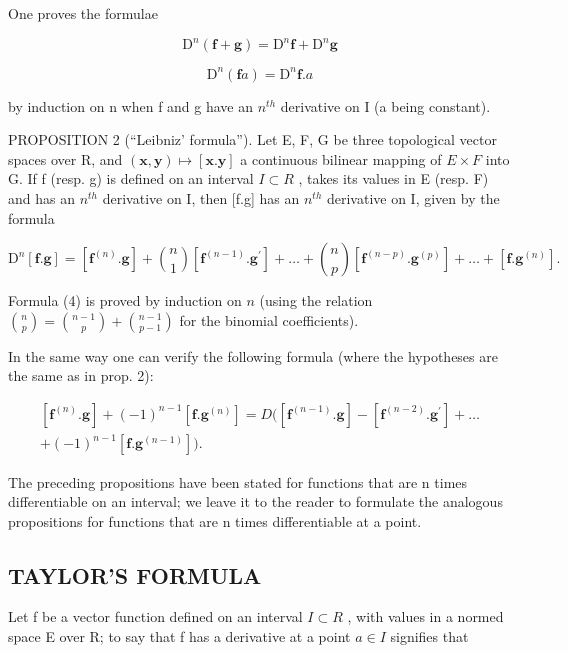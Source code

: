 One proves the formulae

\[
\mathrm{D} ^ {n} (\mathbf {f} + \mathbf {g}) = \mathrm{D} ^ {n} \mathbf {f} + \mathrm{D} ^ {n} \mathbf {g}\tag{2}
\]

\[
\mathrm{D} ^ {n} (\mathbf {f} a) = \mathrm{D} ^ {n} \mathbf {f}. a\tag{3}
\]

by induction on n when f and g have an \(n^{th}\) derivative on I (a being constant).

PROPOSITION 2 (``Leibniz' formula''). Let E, F, G be three topological vector spaces over R, and \((\mathbf{x}, \mathbf{y}) \mapsto [\mathbf{x}.\mathbf{y}]\) a continuous bilinear mapping of \(E \times F\) into G. If f (resp. g) is defined on an interval \(I \subset R\) , takes its values in E (resp. F) and has an \(n^{th}\) derivative on I, then {[}f.g{]} has an \(n^{th}\) derivative on I, given by the formula

\[
\mathrm{D} ^ {n} [ \mathbf {f}. \mathbf {g} ] = [ \mathbf {f} ^ {(n)}. \mathbf {g} ] + \binom {n} {1} [ \mathbf {f} ^ {(n - 1)}. \mathbf {g} ^ {\prime} ] + \dots + \binom {n} {p} [ \mathbf {f} ^ {(n - p)}. \mathbf {g} ^ {(p)} ] + \dots + [ \mathbf {f}. \mathbf {g} ^ {(n)} ].\tag{4}
\]

Formula (4) is proved by induction on \(n\) (using the relation \(\binom{n}{p} = \binom{n-1}{p} + \binom{n-1}{p-1}\) for the binomial coefficients).

In the same way one can verify the following formula (where the hypotheses are the same as in prop. 2):

\[
\begin{array}{c} [ \mathbf {f} ^ {(n)}. \mathbf {g} ] + (- 1) ^ {n - 1} [ \mathbf {f}. \mathbf {g} ^ {(n)} ] = D \big ([ \mathbf {f} ^ {(n - 1)}. \mathbf {g} ] - [ \mathbf {f} ^ {(n - 2)}. \mathbf {g} ^ {\prime} ] + \dots \\ + (- 1) ^ {n - 1} [ \mathbf {f}. \mathbf {g} ^ {(n - 1)} ] \big). \end{array}\tag{5}
\]

The preceding propositions have been stated for functions that are n times differentiable on an interval; we leave it to the reader to formulate the analogous propositions for functions that are n times differentiable at a point.

\subsection{TAYLOR'S FORMULA}

Let f be a vector function defined on an interval \(I \subset R\) , with values in a normed space E over R; to say that f has a derivative at a point \(a \in I\) signifies that

